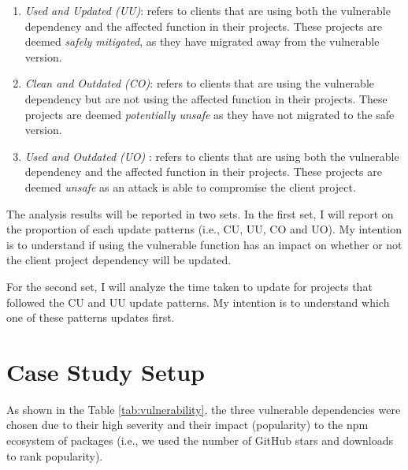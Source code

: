 \begin{itemize}
\begin{enumerate}
    \item \textit{Used and Updated (UU)}: refers to clients that are using both the vulnerable dependency and the affected function in their projects. These projects are deemed \textit{safely mitigated}, as they have migrated away from the vulnerable version. 
    
    \item \textit{Clean and Outdated (CO)}: refers to clients that are using the vulnerable dependency but are not using the affected function in their projects. These projects are deemed \textit{potentially unsafe} as they have not migrated to the safe version.
    
    \item \textit{Used and Outdated (UO)} : refers to clients that are using both the vulnerable dependency and the affected function in their projects. These projects are deemed \textit{unsafe} as an attack is able to compromise the client project.
\end{enumerate}
\end{itemize}

The analysis results will be reported in two sets. In the first set, I will report on the proportion of each update patterns (i.e., CU, UU, CO and UO). My intention is to understand if using the vulnerable function has an impact on whether or not the client project dependency will be updated.

For the second set, I will analyze the time taken to update for projects that followed the CU and UU update patterns. 
My intention is to understand which one of these patterns updates first. 

\section{Case Study Setup}
As shown in the Table \ref{tab:vulnerability}, the three vulnerable dependencies were chosen due to their high severity and their impact (popularity) to the npm ecosystem of packages (i.e., we used the number of GitHub stars and downloads to rank popularity). 

